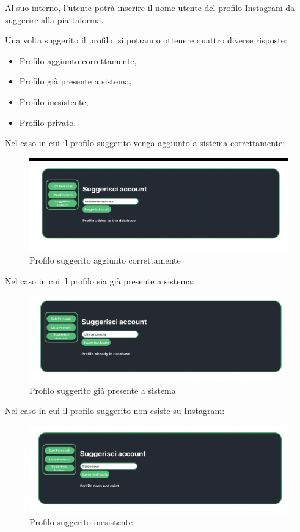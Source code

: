 Al suo interno, l’utente potrà inserire il nome utente del profilo Instagram da suggerire alla piattaforma. 

Una volta suggerito il profilo, si potranno ottenere quattro diverse risposte:

\begin{itemize}
\item Profilo aggiunto correttamente,
\item Profilo già presente a sistema,
\item Profilo inesistente,
\item Profilo privato.
\end{itemize}

Nel caso in cui il profilo suggerito venga aggiunto a sistema correttamente:

\begin{figure}[H]
\centering
\includegraphics[scale=0.4]{./images/AreaPersonale/ProfiloAggiunto.png} 
\caption{Profilo suggerito aggiunto correttamente}
\end{figure}

Nel caso in cui il profilo sia già presente a sistema:

\begin{figure}[H]
\centering
\includegraphics[scale=0.4]{./images/AreaPersonale/ProfiloPresenteNelDB.png} 
\caption{Profilo suggerito già presente a sistema}
\end{figure}

Nel caso in cui il profilo suggerito non esiste su Instagram:

\begin{figure}[H]
\centering
\includegraphics[scale=0.4]{./images/AreaPersonale/ProfiloInesistente.png} 
\caption{Profilo suggerito inesistente}
\end{figure}

